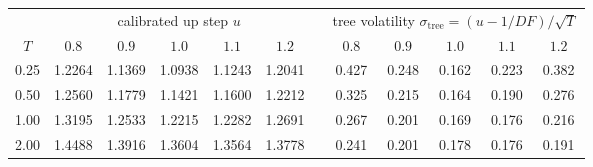 \documentclass[11pt,a4paper]{article}
\begin{document}
\begin{center}
\small
\begin{tabular}{c*{5}{c}c*{5}{c}}
\toprule
 & \multicolumn{5}{c}{calibrated up step $u$} & & \multicolumn{5}{c}{tree volatility $\sigma_{\text{tree}}=(u-1/DF)/\sqrt T$}\\
\cmidrule(lr){2-6}\cmidrule(lr){8-12}
$T$ & $0.8$ & $0.9$ & $1.0$ & $1.1$ & $1.2$ & & $0.8$ & $0.9$ & $1.0$ & $1.1$ & $1.2$\\
\midrule
0.25 & 1.2264 & 1.1369 & 1.0938 & 1.1243 & 1.2041 & & 0.427 & 0.248 & 0.162 & 0.223 & 0.382\\
0.50 & 1.2560 & 1.1779 & 1.1421 & 1.1600 & 1.2212 & & 0.325 & 0.215 & 0.164 & 0.190 & 0.276\\
1.00 & 1.3195 & 1.2533 & 1.2215 & 1.2282 & 1.2691 & & 0.267 & 0.201 & 0.169 & 0.176 & 0.216\\
2.00 & 1.4488 & 1.3916 & 1.3604 & 1.3564 & 1.3778 & & 0.241 & 0.201 & 0.178 & 0.176 & 0.191\\
\bottomrule
\end{tabular}
\label{tab:Bu}
\end{center}
\end{document}
